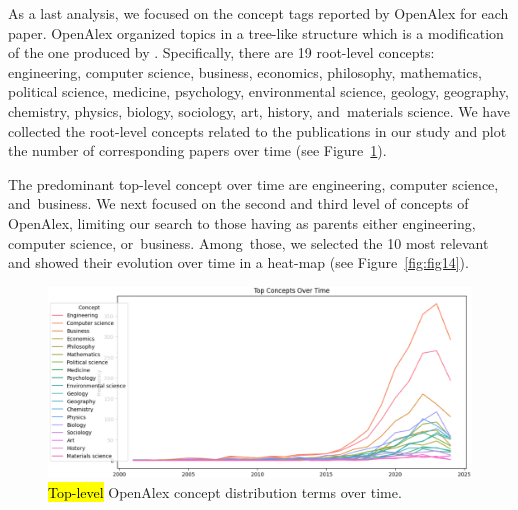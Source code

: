 \documentclass[jmse,review,accept,pdftex,moreauthors]{Definitions/mdpi}
\begin{document}
As a last analysis, we focused on the concept tags reported by OpenAlex for each paper. OpenAlex organized topics in a tree-like structure which is a modification of the one produced by \citep{shen2018web}. Specifically, there are 19 root-level concepts: engineering, computer science, business, economics, philosophy, mathematics, political science, medicine, psychology, environmental science, geology, geography, chemistry, physics, biology, sociology, art, history, and~materials science. We have collected the root-level concepts related to the publications in our study and plot the number of corresponding papers over time (see Figure~\ref{fig:fig13}).



The predominant top-level concept over time are engineering, computer science, and~business. We next focused on the second and third level of concepts of OpenAlex, limiting our search to those having as parents either engineering, computer science, or~business. Among~those, we selected the 10 most relevant and showed their evolution over time in a heat-map (see Figure~\ref{fig:fig14}).


\begin{figure}[H]

	\includegraphics[width=\linewidth]{pics/main_concept_trend_toplevel.eps}
	\caption{\hl{Top-level} %
 OpenAlex {concept distribution terms} %
 over time.}\label{fig:fig13}
\end{figure}
\end{document}
